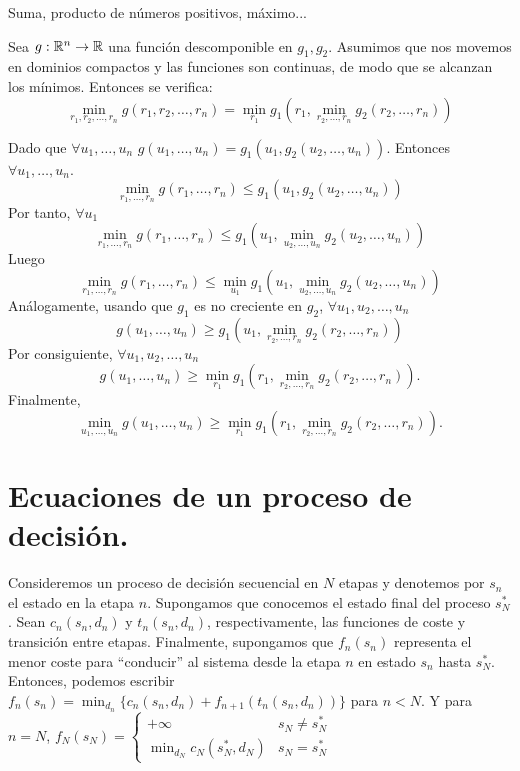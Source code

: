 \documentclass[MIOP.tex]{subfiles}
\begin{document}
\begin{ej}
Suma, producto de números positivos, máximo... 
\end{ej}

\begin{teorema}[Mitten] 
Sea $g:\mathbb{R}^n\to\mathbb{R}$ una función descomponible en $g_1,g_2$. Asumimos que nos movemos en dominios compactos y las funciones son continuas, de modo que se alcanzan los mínimos. Entonces se verifica:
$$\min_{r_1,r_2,\dots,r_n} g(r_1,r_2,\dots,r_n)=\min_{r_1} g_1(r_1,\min_{r_2,\dots,r_n}g_2(r_2,\dots,r_n))$$

\end{teorema}
\begin{dem}
Dado que $\forall u_1,\dots, u_n$ $g(u_1,\dots, u_n)=g_1(u_1,g_2(u_2,\dots, u_n))$. Entonces $\forall u_1,\dots,u_n$.
$$\min_{r_1,\dots,r_n}g(r_1,\dots,r_n)\leq g_1(u_1,g_2(u_2,\dots, u_n))
$$ 
Por tanto, $\forall u_1$
$$\min_{r_1,\dots,r_n}g(r_1,\dots,r_n)\leq g_1(u_1,\min_{u_2,\dots,u_n}g_2(u_2,\dots, u_n))$$ 
Luego 
$$\min_{r_1,\dots,r_n}g(r_1,\dots,r_n)\leq \min_{u_1}g_1(u_1,\min_{u_2,\dots,u_n}g_2(u_2,\dots, u_n))$$
Análogamente, usando que $g_1$ es no creciente en $g_2$, $\forall u_1,u_2,\dots,u_n$
$$g(u_1,\dots, u_n)\geq g_1(u_1,\min_{r_2,\dots,r_n}g_2(r_2,\dots,r_n))$$ Por consiguiente, $\forall u_1,u_2,\dots,u_n$
$$g(u_1,\dots, u_n)\geq \min_{r_1}g_1(r_1,\min_{r_2,\dots,r_n}g_2(r_2,\dots,r_n)).$$ Finalmente,
$$\min_{u_1,\dots,u_n}g(u_1,\dots, u_n)\geq \min_{r_1}g_1(r_1,\min_{r_2,\dots,r_n}g_2(r_2,\dots,r_n)).$$\QED
\end{dem}

\section{Ecuaciones de un proceso de decisión.}
Consideremos un proceso de decisión secuencial en $N$ etapas y denotemos por $s_n$ el estado en la etapa $n$. Supongamos que conocemos el estado final del proceso $s_N^*$. Sean $c_n(s_n,d_n)$ y $t_n(s_n,d_n)$, respectivamente, las funciones de coste y transición entre etapas. Finalmente, supongamos que $f_n(s_n)$ representa el menor coste para ``conducir'' al sistema desde la etapa $n$ en estado $s_n$ hasta $s_N^*$. Entonces, podemos escribir $f_n(s_n)=\min_{d_n}\{c_n(s_n,d_n)+f_{n+1}(t_n(s_n,d_n))\}$ para $n<N$. Y para $n=N$, $f_N(s_N)=\begin{cases}
+\infty & s_N\neq s_N^*\\
\min_{d_N}c_N(s_N^*, d_N) & s_N=s_N^*
\end{cases}$
\end{document}
